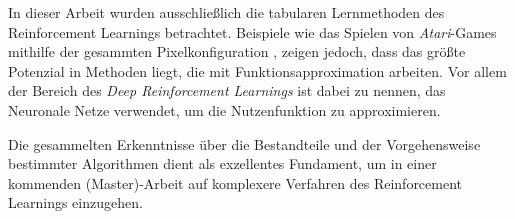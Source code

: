 In dieser Arbeit wurden ausschließlich die tabularen Lernmethoden des Reinforcement Learnings betrachtet. Beispiele wie das Spielen von \textit{Atari}-Games mithilfe der gesammten Pixelkonfiguration \cite{dqn}, zeigen jedoch, dass das größte Potenzial in Methoden liegt, die mit Funktionsapproximation arbeiten. Vor allem der Bereich des \textit{Deep Reinforcement Learnings} ist dabei zu nennen, das Neuronale Netze verwendet, um die Nutzenfunktion zu approximieren.
\par
Die gesammelten Erkenntnisse über die Bestandteile und der Vorgehensweise bestimmter Algorithmen dient als exzellentes Fundament, um in einer kommenden (Master)-Arbeit auf komplexere Verfahren des Reinforcement Learnings einzugehen.
